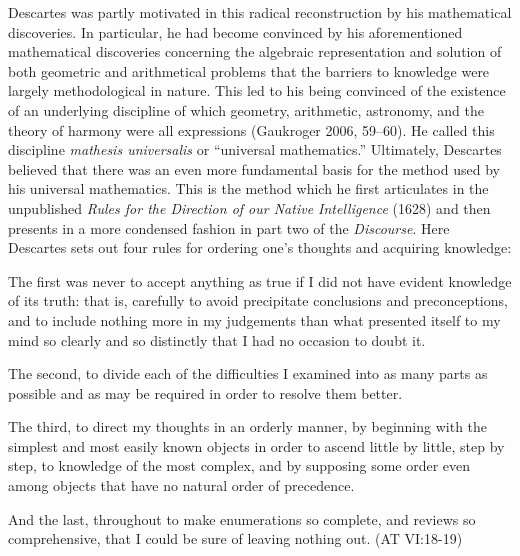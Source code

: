 \documentclass[12pt]{article}
\makeatletter
\newcommand{\citeprocitem}[2]{\hyper@linkstart{cite}{citeproc_bib_item_#1}#2\hyper@linkend}
\makeatother
\begin{document}
Descartes was partly motivated in this radical reconstruction by his
mathematical discoveries. In particular, he had become convinced by his
aforementioned mathematical discoveries concerning the algebraic representation
and solution of both geometric and arithmetical problems that the barriers to
knowledge were largely methodological in nature. This led to his being convinced
of the existence of an underlying discipline of which geometry, arithmetic,
astronomy, and the theory of harmony were all expressions (\citeprocitem{4}{Gaukroger 2006, 59–60}). He called this discipline \emph{mathesis universalis} or ``universal
mathematics.'' Ultimately, Descartes believed that there was an even more
fundamental basis for the method used by his universal mathematics. This is the
method which he first articulates in the unpublished \emph{Rules for the Direction of
our Native Intelligence} (1628) and then presents in a more condensed fashion in
part two of the \emph{Discourse}. Here Descartes sets out four rules for ordering one's
thoughts and acquiring knowledge:

\begin{quote-b}
The first was never to accept anything as true if I did not have evident knowledge
of its truth: that is, carefully to avoid precipitate conclusions and
preconceptions, and to include nothing more in my judgements than what presented
itself to my mind so clearly and so distinctly that I had no occasion to doubt it.
\end{quote-b}

\begin{quote-b}
The second, to divide each of the difficulties I examined into as many parts as
possible and as may be required in order to resolve them better.
\end{quote-b}

\begin{quote-b}
The third, to direct my thoughts in an orderly manner, by beginning with the
simplest and most easily known objects in order to ascend little by little, step by
step, to knowledge of the most complex, and by supposing some order even among
objects that have no natural order of precedence.
\end{quote-b}

\begin{quote-b}
And the last, throughout to make enumerations so complete, and reviews so
comprehensive, that I could be sure of leaving nothing out. (AT VI:18-19)
\end{quote-b}
\end{document}
